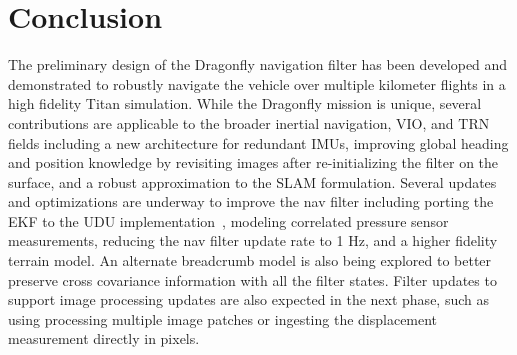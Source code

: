 \section{Conclusion} \label{conclusion}

The preliminary design of the Dragonfly navigation filter has been developed and demonstrated to robustly navigate the vehicle over multiple kilometer flights in a high fidelity Titan simulation. While the Dragonfly mission is unique, several contributions are applicable to the broader inertial navigation, VIO, and TRN fields including a new architecture for redundant IMUs, improving global heading and position knowledge by revisiting images after re-initializing the filter on the surface, and a robust approximation to the SLAM formulation. Several updates and optimizations are underway to improve the nav filter including porting the EKF to the UDU implementation~\cite{carpenter2018}, modeling correlated pressure sensor measurements, reducing the nav filter update rate to 1 Hz, and a higher fidelity terrain model. An alternate breadcrumb model is also being explored to better preserve cross covariance information with all the filter states. Filter updates to support image processing updates are also expected in the next phase, such as using processing multiple image patches or ingesting the displacement measurement directly in pixels.  